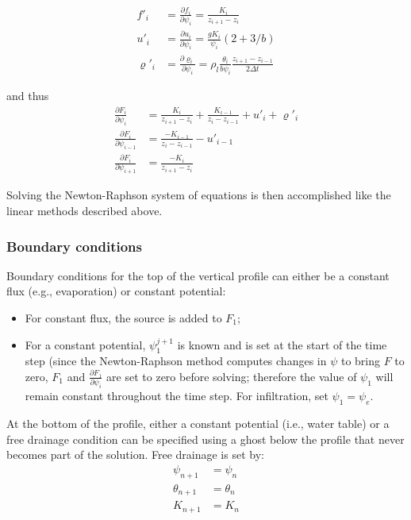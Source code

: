 \documentclass[10pt, letterpapr]{article}
\begin{document}
\begin{align*}
	f'_i &=\frac{\partial f_i}{\partial\psi_i}=\frac{K_i}{z_{i+1}-z_i} \\
	u'_i &=\frac{\partial u_i}{\partial\psi_i}=\frac{gK_i}{\psi_i}(2+3/b) \\
	\varrho'_i &=\frac{\partial \varrho_i}{\partial\psi_i}=\rho_l\frac{\theta_i}{b\psi_i}\frac{z_{i+1}-z_{i-1}}{2\Delta t}
\end{align*}

\noindent and thus %
\begin{align*}
	\frac{\partial F_i}{\partial\psi_i} &=\frac{K_i}{z_{i+1}-z_i}+\frac{K_{i-1}}{z_i-z_{i-1}}+u'_i+\varrho'_i \\
	\frac{\partial F_i}{\partial\psi_{i-1}} &=\frac{-K_{i-1}}{z_i-z_{i-1}}-u'_{i-1} \\
	\frac{\partial F_i}{\partial\psi_{i+1}} &=\frac{-K_i}{z_{i+1}-z_i}
\end{align*}

\noindent Solving the Newton-Raphson system of equations is then accomplished like the linear methods described above.



\subsubsection*{Boundary conditions}

Boundary conditions for the top of the vertical profile can either be a constant flux (e.g., evaporation) or constant potential:

\begin{itemize}
	\item For constant flux, the source is added to $F_1$; 
	\item For a constant potential, $\psi_1^{j+1}$ is known and is set at the start of the time step (since the Newton-Raphson method computes changes in $\psi$ to bring $F$ to zero, $F_1$ and $\frac{\partial F_1}{\partial\psi_i}$ are set to zero before solving; therefore the value of $\psi_1$ will remain constant throughout the time step. For infiltration, set $\psi_1=\psi_e$.
\end{itemize}

At the bottom of the profile, either a constant potential (i.e., water table) or a free drainage condition can be specified using a ghost below the profile that never becomes part of the solution. Free drainage is set by:
\begin{align*}
	\psi_{n+1} &=\psi_n \\
	\theta_{n+1} &=\theta_n \\
	K_{n+1} &=K_n
\end{align*}
\end{document}
